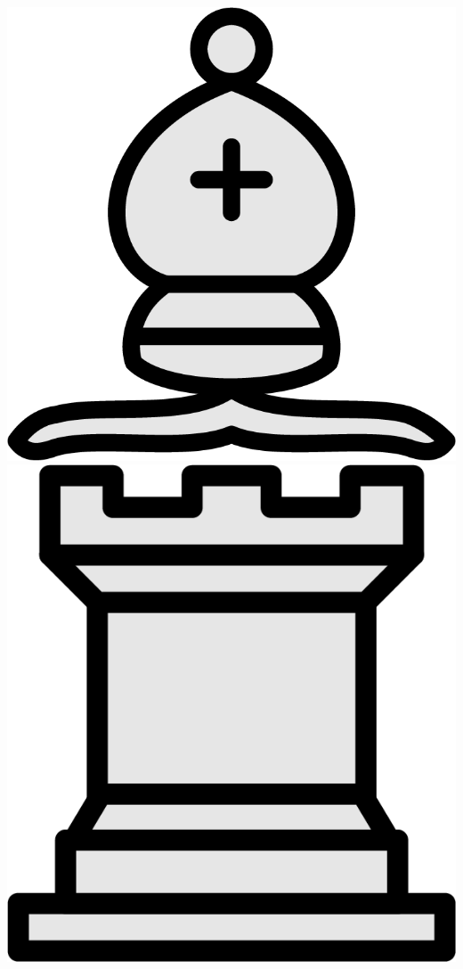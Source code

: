 \documentclass{article}
\begin{document}
\begin{center}
	\includegraphics[scale=0.07]{image16}
	\includegraphics[scale=0.07]{image7}

\end{center}
\end{document}
